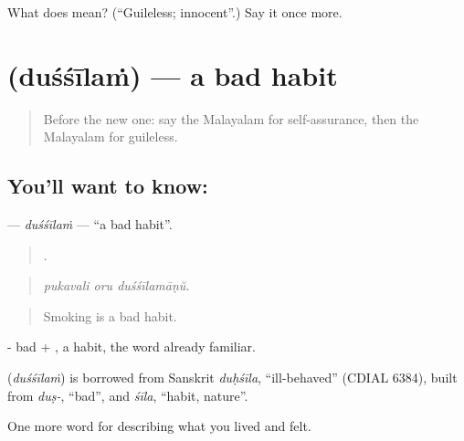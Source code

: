 \begin{tcolorbox}[breakable,colback=teal!4,colframe=teal!35!black,title={Before you move on}]
What does  mean? (\textquotedblleft{}Guileless; innocent\textquotedblright{}.) Say it once more.
\end{tcolorbox}
\section[\texorpdfstring{\ml{ദുശ്ശീലം} (duśśīlaṁ)}{ദുശ്ശീലം (duśśīlaṁ)}]{ (duśśīlaṁ) — a bad habit}

\label{lesson:ML-C529-dussilam}



\begin{quote}
Before the new one: say the Malayalam for self-assurance, then the Malayalam for guileless.
\end{quote}

\subsection*{You'll want to know: }
\textbf{} — \emph{duśśīlaṁ} — \textquotedblleft{}a bad habit\textquotedblright{}.

\begin{quote}
  .
\end{quote}

\begin{quote}
\emph{pukavali oru duśśīlamāṇŭ.}
\end{quote}

\begin{quote}
Smoking is a bad habit.
\end{quote}

- bad + , a habit, the word already familiar.

\begin{cousinweb}
\textbf{} (\emph{duśśīlaṁ}) is borrowed from Sanskrit \emph{duḥśīla}, \textquotedblleft{}ill-behaved\textquotedblright{} (CDIAL 6384), built from \emph{duṣ-}, \textquotedblleft{}bad\textquotedblright{}, and \emph{śīla}, \textquotedblleft{}habit, nature\textquotedblright{}.
\end{cousinweb}

\begin{grammarlens}[title={What you've built}]
One more word for describing what you lived and felt.
\end{grammarlens}

